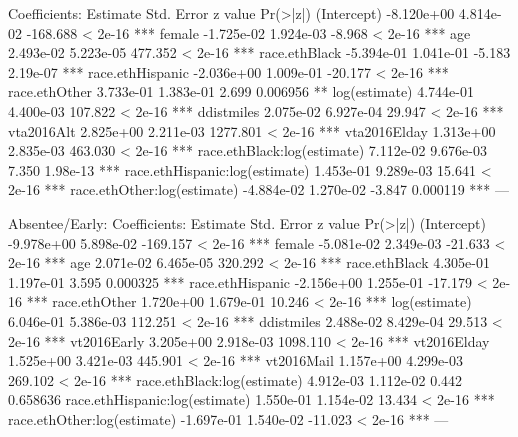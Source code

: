Coefficients:
                                 Estimate Std. Error  z value Pr(>|z|)    
(Intercept)                    -8.120e+00  4.814e-02 -168.688  < 2e-16 ***
female                         -1.725e-02  1.924e-03   -8.968  < 2e-16 ***
age                             2.493e-02  5.223e-05  477.352  < 2e-16 ***
race.ethBlack                  -5.394e-01  1.041e-01   -5.183 2.19e-07 ***
race.ethHispanic               -2.036e+00  1.009e-01  -20.177  < 2e-16 ***
race.ethOther                   3.733e-01  1.383e-01    2.699 0.006956 ** 
log(estimate)                   4.744e-01  4.400e-03  107.822  < 2e-16 ***
ddistmiles                      2.075e-02  6.927e-04   29.947  < 2e-16 ***
vta2016Alt                      2.825e+00  2.211e-03 1277.801  < 2e-16 ***
vta2016Elday                    1.313e+00  2.835e-03  463.030  < 2e-16 ***
race.ethBlack:log(estimate)     7.112e-02  9.676e-03    7.350 1.98e-13 ***
race.ethHispanic:log(estimate)  1.453e-01  9.289e-03   15.641  < 2e-16 ***
race.ethOther:log(estimate)    -4.884e-02  1.270e-02   -3.847 0.000119 ***
---



Absentee/Early:
Coefficients:
                                 Estimate Std. Error  z value Pr(>|z|)    
(Intercept)                    -9.978e+00  5.898e-02 -169.157  < 2e-16 ***
female                         -5.081e-02  2.349e-03  -21.633  < 2e-16 ***
age                             2.071e-02  6.465e-05  320.292  < 2e-16 ***
race.ethBlack                   4.305e-01  1.197e-01    3.595 0.000325 ***
race.ethHispanic               -2.156e+00  1.255e-01  -17.179  < 2e-16 ***
race.ethOther                   1.720e+00  1.679e-01   10.246  < 2e-16 ***
log(estimate)                   6.046e-01  5.386e-03  112.251  < 2e-16 ***
ddistmiles                      2.488e-02  8.429e-04   29.513  < 2e-16 ***
vt2016Early                     3.205e+00  2.918e-03 1098.110  < 2e-16 ***
vt2016Elday                     1.525e+00  3.421e-03  445.901  < 2e-16 ***
vt2016Mail                      1.157e+00  4.299e-03  269.102  < 2e-16 ***
race.ethBlack:log(estimate)     4.912e-03  1.112e-02    0.442 0.658636    
race.ethHispanic:log(estimate)  1.550e-01  1.154e-02   13.434  < 2e-16 ***
race.ethOther:log(estimate)    -1.697e-01  1.540e-02  -11.023  < 2e-16 ***
---


